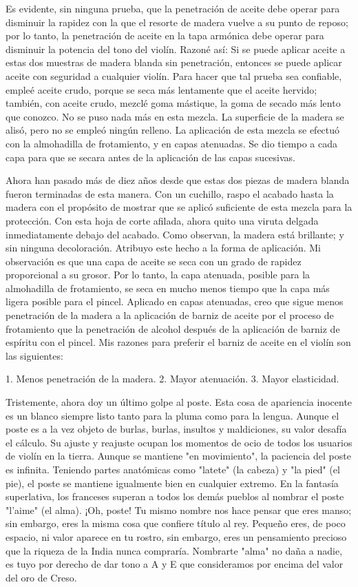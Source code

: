 \documentclass[12pt]{book}
\begin{document}
Es evidente, sin ninguna prueba, que la penetración de aceite debe operar para disminuir la rapidez con la que el resorte de madera vuelve a su punto de reposo; por lo tanto, la penetración de aceite en la tapa armónica debe operar para disminuir la potencia del tono del violín. Razoné así: Si se puede aplicar aceite a estas dos muestras de madera blanda sin penetración, entonces se puede aplicar aceite con seguridad a cualquier violín. Para hacer que tal prueba sea confiable, empleé aceite crudo, porque se seca más lentamente que el aceite hervido; también, con aceite crudo, mezclé goma mástique, la goma de secado más lento que conozco. No se puso nada más en esta mezcla. La superficie de la madera se alisó, pero no se empleó ningún relleno. La aplicación de esta mezcla se efectuó con la almohadilla de frotamiento, y en capas atenuadas. Se dio tiempo a cada capa para que se secara antes de la aplicación de las capas sucesivas.

Ahora han pasado más de diez años desde que estas dos piezas de madera blanda fueron terminadas de esta manera. Con un cuchillo, raspo el acabado hasta la madera con el propósito de mostrar que se aplicó suficiente de esta mezcla para la protección. Con esta hoja de corte afilada, ahora quito una viruta delgada inmediatamente debajo del acabado. Como observan, la madera está brillante; y sin ninguna decoloración. Atribuyo este hecho a la forma de aplicación. Mi observación es que una capa de aceite se seca con un grado de rapidez proporcional a su grosor. Por lo tanto, la capa atenuada, posible para la almohadilla de frotamiento, se seca en mucho menos tiempo que la capa más ligera posible para el pincel. Aplicado en capas atenuadas, creo que sigue menos penetración de la madera a la aplicación de barniz de aceite por el proceso de frotamiento que la penetración de alcohol después de la aplicación de barniz de espíritu con el pincel. Mis razones para preferir el barniz de aceite en el violín son las siguientes:

1. Menos penetración de la madera.
2. Mayor atenuación.
3. Mayor elasticidad.

Tristemente, ahora doy un último golpe al poste. Esta cosa de apariencia inocente es un blanco siempre listo tanto para la pluma como para la lengua. Aunque el poste es a la vez objeto de burlas, burlas, insultos y maldiciones, su valor desafía el cálculo. Su ajuste y reajuste ocupan los momentos de ocio de todos los usuarios de violín en la tierra. Aunque se mantiene "en movimiento", la paciencia del poste es infinita. Teniendo partes anatómicas como "latete" (la cabeza) y "la pied" (el pie), el poste se mantiene igualmente bien en cualquier extremo. En la fantasía superlativa, los franceses superan a todos los demás pueblos al nombrar el poste "l'aime" (el alma).
¡Oh, poste! Tu mismo nombre nos hace pensar que eres manso; sin embargo, eres la misma cosa que confiere título al rey. Pequeño eres, de poco espacio, ni valor aparece en tu rostro, sin embargo, eres un pensamiento precioso que la riqueza de la India nunca compraría. Nombrarte "alma" no daña a nadie, es tuyo por derecho de dar tono a A y E que consideramos por encima del valor del oro de Creso.
\end{document}
